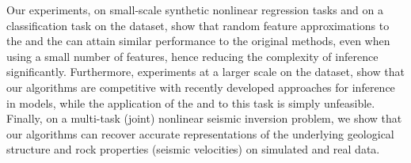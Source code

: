 Our experiments, on small-scale synthetic nonlinear regression tasks and on 
a classification task on the \usps dataset, show that random feature approximations to the 
\egp and the \ugp can attain similar performance to the original methods, 
even when using a small number of features, hence reducing the complexity 
of inference significantly. Furthermore, experiments at a larger scale on 
the \mnist dataset, show that our algorithms are competitive with recently developed 
approaches for inference in \gp models, while the application of the \egp and \ugp to
this task is simply unfeasible. Finally, on a multi-task (joint) nonlinear seismic inversion  problem,
we show that our algorithms can recover accurate representations of the underlying 
geological structure and rock properties (seismic velocities) on simulated and real data.



 



 






